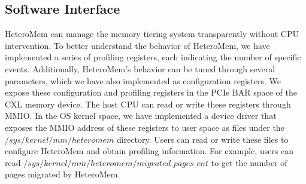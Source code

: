 

\subsection{Software Interface}

HeteroMem can manage the memory tiering system transparently without CPU intervention. To better understand the behavior of HeteroMem, we have implemented a series of profiling registers, each indicating the number of specific events. Additionally, HeteroMem's behavior can be tuned through several parameters, which we have also implemented as configuration registers.
We expose these configuration and profiling registers in the PCIe BAR space of the CXL memory device. The host CPU can read or write these registers through MMIO. In the OS kernel space, we have implemented a device driver that exposes the MMIO address of these registers to user space as files under the $/sys/kernel/mm/heteromem$ directory. Users can read or write these files to configure HeteroMem and obtain profiling information. For example, users can read $/sys/kernel/mm/heteromem/migrated\_pages\_cnt$ to get the number of pages migrated by HeteroMem. 

% 

\label{sec:heterobox_software_interface}
